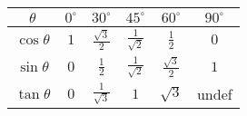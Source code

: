 \begin{table}[H]
\begin{center}
\setlength{\extrarowheight}{2.5pt}

\begin{tabular}{|c|c|c|c|c|c|}\hline
$\theta$
&
${0}^{\circ }$
&
${30}^{\circ }$
&
${45}^{\circ }$
&
${60}^{\circ }$
&
${90}^{\circ }$



\\ \hline
$\cos \theta $
 &
$1$
&
$\frac{\sqrt{3}}{2}$
&
$\frac{1}{\sqrt{2}}$
&
$\frac{1}{2}$
&
$0$


\\ \hline
$\sin \theta $
&
$0$
&
$\frac{1}{2} $
&
$\frac{1}{\sqrt{2}}$
&
$\frac{\sqrt{3}}{2}$
&
$1$

\\ \hline
$\tan \theta $
&
$0$
&
$\frac{1}{\sqrt{3}}$
&
$1$ &
$\sqrt{3}$
&
undef


\\ \hline
\end{tabular}
\end{center}
\end{table}



